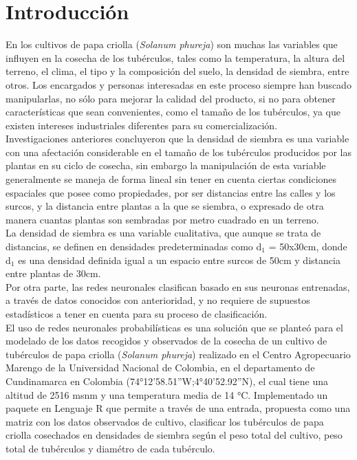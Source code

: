 

\chapter*{Introducci\'on}

En los cultivos de papa criolla (\textit{Solanum phureja}) son muchas las variables que influyen en la cosecha de los tub\'erculos, tales como la temperatura, la altura del terreno, el clima, el tipo y la composici\'on del suelo, la densidad de siembra, entre otros. Los encargados y personas interesadas en este proceso siempre han buscado manipularlas,  no sólo para mejorar la calidad del producto, si no para obtener caracter\'isticas que sean convenientes, como el tama\~no de los tub\'erculos, ya que existen intereses industriales diferentes para su comercializaci\'on.\\

Investigaciones anteriores concluyeron que la densidad de siembra es una variable con una afectaci\'on considerable en el tama\~no de los tub\'erculos producidos por las plantas en su ciclo de cosecha, sin embargo la manipulación de esta variable generalmente se maneja de forma lineal sin tener en cuenta ciertas condiciones espaciales que posee como propiedades, por ser distancias entre las calles y los surcos, y la distancia entre plantas a la que se siembra, o expresado de otra manera cuantas plantas son sembradas por metro cuadrado en un terreno.\\

La densidad de siembra es una variable cualitativa, que aunque se trata de distancias, se definen en densidades predeterminadas como d$_1$ = 50x30cm, donde d$_1$ es una densidad definida igual a un espacio entre  surcos de 50cm y distancia entre plantas de 30cm.\\

Por otra parte, las redes neuronales clasifican basado en sus neuronas entrenadas, a través de datos conocidos con anterioridad, y no requiere de supuestos estad\'isticos a tener en cuenta para su proceso de clasificación.\\

El uso de redes neuronales probabil\'isticas es una soluci\'on que se planteó para el modelado de los datos recogidos y observados de la cosecha de un cultivo de tubérculos de papa criolla (\textit{Solanum phureja}) realizado en el Centro Agropecuario Marengo de la Universidad Nacional de Colombia, en el departamento de Cundinamarca en Colombia (74°12'58.51''W;4°40'52.92''N), el cual tiene una altitud de 2516 msnm y una temperatura media de 14 °C. Implementado un paquete en Lenguaje R que permite a través de una entrada, propuesta como una matriz  con los datos observados de cultivo, clasificar los tub\'erculos de papa criolla cosechados en densidades de siembra seg\'un el peso total del cultivo, peso total de tub\'erculos y diam\'etro de cada tub\'erculo.\\

